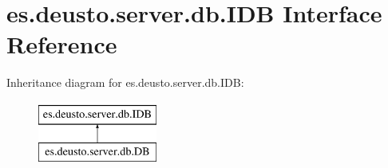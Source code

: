 \hypertarget{interfacees_1_1deusto_1_1server_1_1db_1_1_i_d_b}{}\section{es.\+deusto.\+server.\+db.\+I\+DB Interface Reference}
\label{interfacees_1_1deusto_1_1server_1_1db_1_1_i_d_b}
Inheritance diagram for es.\+deusto.\+server.\+db.\+I\+DB\+:\begin{figure}[H]
\begin{center}
\leavevmode
\includegraphics[height=2.000000cm]{interfacees_1_1deusto_1_1server_1_1db_1_1_i_d_b}
\end{center}
\end{figure}
